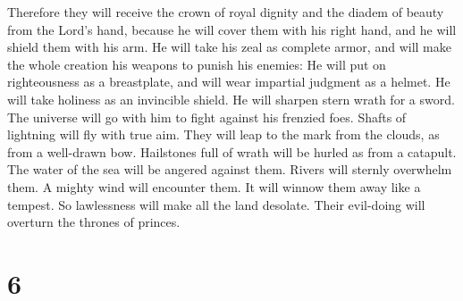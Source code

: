 Therefore they will receive the crown of royal dignity and the diadem of
beauty from the Lord's hand, because he will cover them with his right
hand, and he will shield them with his arm.  He will take
his zeal as complete armor, and will make the whole creation his weapons
to punish his enemies:  He will put on righteousness as a
breastplate, and will wear impartial judgment as a helmet. 
He will take holiness as an invincible shield.  He will
sharpen stern wrath for a sword. The universe will go with him to fight
against his frenzied foes.  Shafts of lightning will fly
with true aim. They will leap to the mark from the clouds, as from a
well-drawn bow.  Hailstones full of wrath will be hurled as
from a catapult. The water of the sea will be angered against them.
Rivers will sternly overwhelm them.  A mighty wind will
encounter them. It will winnow them away like a tempest. So lawlessness
will make all the land desolate. Their evil-doing will overturn the
thrones of princes.

\hypertarget{section-4}{%
\section{6}\label{section-4}}

